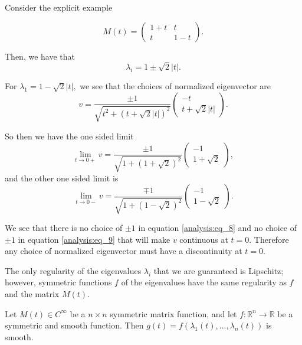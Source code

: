 \begin{example}
Consider the explicit example

\begin{equation}
M(t) = \begin{pmatrix}
1 + t & t\\
t & 1-t
\end{pmatrix}.
\end{equation}

Then, we have that
\begin{equation}
\lambda_i = 1 \pm \sqrt{2}|t|.
\end{equation}

For $\lambda_1 = 1-\sqrt{2}|t|,$ we see that the choices of normalized eigenvector are
\begin{equation}
v = \frac{\pm 1}{\sqrt{t^2 + (t+\sqrt{2}|t|)^2}}\begin{pmatrix} -t \\ t+\sqrt{2}|t|  \end{pmatrix}.
\end{equation}

So then we have the one sided limit
\begin{equation}\label{analysis:eq_8}
\lim\limits_{t\to 0+} v = \frac{\pm 1}{\sqrt{1+(1+\sqrt{2})^2}}\begin{pmatrix}-1 \\ 1 + \sqrt{2} \end{pmatrix},
\end{equation}
and the other one sided limit is
\begin{equation}\label{analysis:eq_9}
\lim\limits_{t\to 0-} v = \frac{\mp 1}{\sqrt{1+(1-\sqrt{2})^2}}\begin{pmatrix}-1 \\ 1 - \sqrt{2} \end{pmatrix}.
\end{equation}

We see that there is no choice of $\pm 1$ in equation \eqref{analysis:eq_8} and no choice of $\pm 1$ in equation \eqref{analysis:eq_9} that will make $v$ continuous at $t=0$. Therefore any choice of normalized eigenvector must have a discontinuity at $t=0$.
\end{example}

The only regularity of the eigenvalues $\lambda_i$ that we are guaranteed is Lipschitz; however, symmetric functions $f$ of the eigenvalues have the same regularity as $f$ and the matrix $M(t)$.

 \begin{proposition}
 
Let $M(t) \in C^\infty$ be a $n\times n$ symmetric matrix function, and let $f: \mathbb R^n \to \mathbb R$ be a symmetric and smooth function. Then $g(t) = f(\lambda_1(t),..., \lambda_n(t))$ is smooth.

\end{proposition}

